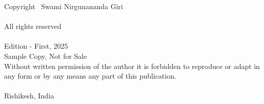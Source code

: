 \thispagestyle{empty}
Copyright \textcopyright\ Swami Nirgunananda Giri\\
\\
All rights reserved\\
\\
Edition - First, 2025\\
Sample Copy, Not for Sale\\
\vfill
Without written permission of the author it is forbidden to reproduce or adapt in any form or by any means any part of this  publication.\\
\\
Rishikesh, India\\
\newpage